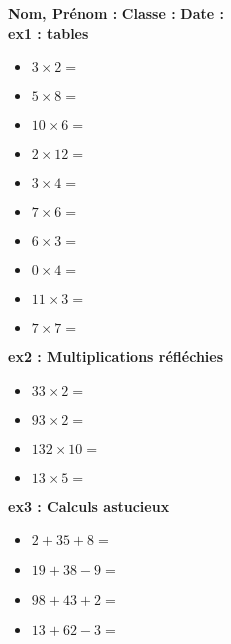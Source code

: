 



\textbf{Nom, Prénom :} \hspace{8cm} \textbf{Classe :} \hspace{3cm} \textbf{Date :}\\

\vspace{-0.5cm} 
\textbf{ex1 : tables}

\begin{multicols}{2}
\begin{itemize}[label={$\bullet$}]
  \item $3  \times 2 = $ \dotfill
  \item $5  \times 8 = $ \dotfill
  \item $10 \times 6 = $ \dotfill
  \item $2  \times 12  = $  \dotfill
  \item $3 \times 4 = $ \dotfill \columnbreak
  \item $7 \times 6  = $ \dotfill
  \item $6 \times 3 = $ \dotfill
  \item $0 \times 4 = $ \dotfill
  \item $11 \times 3 = $ \dotfill
  \item $7 \times 7 = $ \dotfill
\end{itemize} 
\end{multicols}

\begin{multicols}{2}
  \textbf{ex2 : Multiplications réfléchies}

\begin{itemize}[label={$\bullet$}]
  \item $33  \times 2 =$  \dotfill
  \item $93  \times 2 = $ \dotfill
  \item $132  \times 10 = $ \dotfill
  \item $13  \times 5 = $ \dotfill
\end{itemize} 
\columnbreak

\textbf{ex3 : Calculs astucieux}

\begin{itemize}[label={$\bullet$}]
  \item $2 + 35 + 8 = $ \dotfill
  \item $19 + 38 - 9 = $ \dotfill
  \item $98 + 43 + 2 = $ \dotfill
  \item $13 + 62 - 3 = $ \dotfill
\end{itemize} 
\end{multicols}


